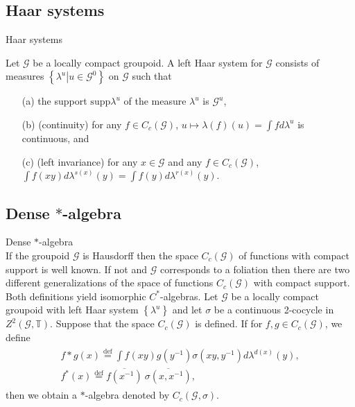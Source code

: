 \documentclass{beamer}
\theoremstyle{plain}
\newcommand{\G}{\mathcal{G}}
\newcommand{\supp}{\mathrm{supp}}
\newcommand{\T}{\mathbb{T}}
\newcommand{\la}{\lambda}
\newcommand{\bean}{\begin{eqnarray*}}
\newcommand{\eean}{\end{eqnarray*}}
\newcommand{\bydef}{\stackrel{\mathrm{def}}{=}}
\begin{document}
\subsection{Haar systems}
\begin{frame}
	\huge Haar systems \normalsize\\

\begin{definition}
Let $\G$ be a locally compact  groupoid. A \alert{left  Haar system} for $\G$
consists of measures $\left\{\left.\la^u \right| u \in \G^0\right\}$ on $\G$ such that
\begin{enumerate}
	\item [(a)] the support $\supp\la^u$ of the measure $\la^u$ is $\G^u$,
	\item [(b)]  (continuity) for any $f \in C_c\left(\G\right)$, $u \mapsto \la(f)(u) = \int f d\la^u$ is continuous, and
	\item [(c)]  (left invariance) for any $x\in \G$ and any $f \in  C_c(\G )$, $\int  f ( x y ) d\la^{s(x)}(y) =
	\int f(y)d\la^{r(x)}(y)$.
	
\end{enumerate}
\end{definition}
\end{frame}
\subsection{Dense $*$-algebra}

\begin{frame}
	\huge	Dense $*$-algebra \normalsize\\
	If the groupoid $\G$ is Hausdorff then the space $C_c\left( \G\right)$ of functions with compact support is well known. If not and $\G$ corresponds to a foliation then  there are two  different generalizations of  the space of functions  $C_c\left( \G\right)$  with compact support. Both definitions yield isomorphic $C^*$-algebras.
	Let $\G$ be a locally compact groupoid with left  Haar system $\left\{\la^u\right\}$ and let $\sigma$ be a continuous 2-cocycle in $Z^2\left(\G, \T\right)$. Suppose that the space $C_c\left( \G\right)$ is defined.
	If for $f ,g \in C_c(\G)$, we define
	\bean
	\begin{split}
		f * g \left(x\right)\bydef 
		\int f ( x y ) g \left( y^{-1}\right)\sigma\left(xy, y^{-1} \right) d\la^{d(x)}(y),\\
		f^* ( x ) \bydef \overline{f ( x^{ -1})}~\overline{\sigma\left(x, x^{-1} \right)}, 	
	\end{split}
	\eean
	then we obtain a $*$-algebra denoted by $C_c(\G, \sigma)$.
	
	
\end{frame}
\end{document}
